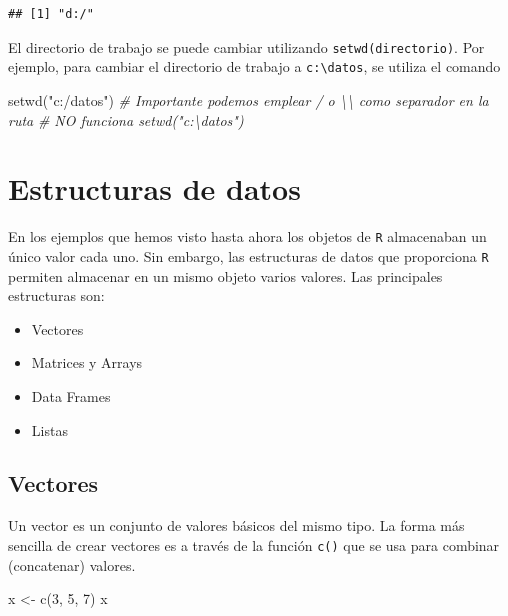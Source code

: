 \documentclass[
]{book}
\newenvironment{Shaded}{\begin{snugshade}}{\end{snugshade}}
\newcommand{\CommentTok}[1]{\textcolor[rgb]{0.56,0.35,0.01}{\textit{#1}}}
\newcommand{\DecValTok}[1]{\textcolor[rgb]{0.00,0.00,0.81}{#1}}
\newcommand{\FunctionTok}[1]{\textcolor[rgb]{0.00,0.00,0.00}{#1}}
\newcommand{\NormalTok}[1]{#1}
\newcommand{\OtherTok}[1]{\textcolor[rgb]{0.56,0.35,0.01}{#1}}
\newcommand{\StringTok}[1]{\textcolor[rgb]{0.31,0.60,0.02}{#1}}
\theoremstyle{break}
\theoremstyle{nonumberplain}
\begin{document}
\begin{verbatim}
## [1] "d:/"
\end{verbatim}

El directorio de trabajo se puede cambiar utilizando \texttt{setwd(directorio)}.
Por ejemplo, para cambiar el directorio de trabajo a \texttt{c:\textbackslash{}datos}, se utiliza el comando

\begin{Shaded}
\begin{Highlighting}[]
\FunctionTok{setwd}\NormalTok{(}\StringTok{"c:/datos"}\NormalTok{)}
\CommentTok{\# Importante podemos emplear \textquotesingle{}/\textquotesingle{} o \textquotesingle{}\textbackslash{}\textbackslash{}\textquotesingle{} como separador en la ruta}
\CommentTok{\# NO funciona setwd("c:\textbackslash{}datos")}
\end{Highlighting}
\end{Shaded}

\hypertarget{estructuras}{%
\chapter{Estructuras de datos}\label{estructuras}}

En los ejemplos que hemos visto hasta ahora los objetos de \texttt{R} almacenaban un único valor cada uno.
Sin embargo, las estructuras de datos que proporciona \texttt{R} permiten almacenar en un mismo objeto varios valores.
Las principales estructuras son:

\begin{itemize}
\item
  Vectores
\item
  Matrices y Arrays
\item
  Data Frames
\item
  Listas
\end{itemize}

\hypertarget{vectores}{%
\section{Vectores}\label{vectores}}

Un vector es un conjunto de valores básicos del mismo tipo.
La forma más sencilla de crear vectores es a
través de la función \texttt{c()} que se usa para combinar (concatenar) valores.

\begin{Shaded}
\begin{Highlighting}[]
\NormalTok{x }\OtherTok{\textless{}{-}} \FunctionTok{c}\NormalTok{(}\DecValTok{3}\NormalTok{, }\DecValTok{5}\NormalTok{, }\DecValTok{7}\NormalTok{)}
\NormalTok{x}
\end{Highlighting}
\end{Shaded}
\end{document}
